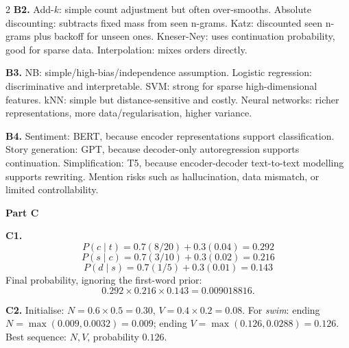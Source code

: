 \documentclass[11pt,a4paper]{article}
\begin{document}
\begin{multicols}{2}
\textbf{B2.} Add-\(k\): simple count adjustment but often over-smooths. Absolute discounting: subtracts fixed mass from seen n-grams. Katz: discounted seen n-grams plus backoff for unseen ones. Kneser-Ney: uses continuation probability, good for sparse data. Interpolation: mixes orders directly.

\textbf{B3.} NB: simple/high-bias/independence assumption. Logistic regression: discriminative and interpretable. SVM: strong for sparse high-dimensional features. kNN: simple but distance-sensitive and costly. Neural networks: richer representations, more data/regularisation, higher variance.

\textbf{B4.} Sentiment: BERT, because encoder representations support classification. Story generation: GPT, because decoder-only autoregression supports continuation. Simplification: T5, because encoder-decoder text-to-text modelling supports rewriting. Mention risks such as hallucination, data mismatch, or limited controllability.

\textbf{Part C}

\textbf{C1.}
\[
P(c\mid t)=0.7(8/20)+0.3(0.04)=0.292
\]
\[
P(s\mid c)=0.7(3/10)+0.3(0.02)=0.216
\]
\[
P(d\mid s)=0.7(1/5)+0.3(0.01)=0.143
\]
Final probability, ignoring the first-word prior:
\[
0.292\times0.216\times0.143=0.009018816.
\]

\textbf{C2.} Initialise: \(N=0.6\times0.5=0.30\), \(V=0.4\times0.2=0.08\). For \textit{swim}: ending \(N=\max(0.009,0.0032)=0.009\); ending \(V=\max(0.126,0.0288)=0.126\). Best sequence: \(N,V\), probability \(0.126\).

\end{multicols}
\end{document}
